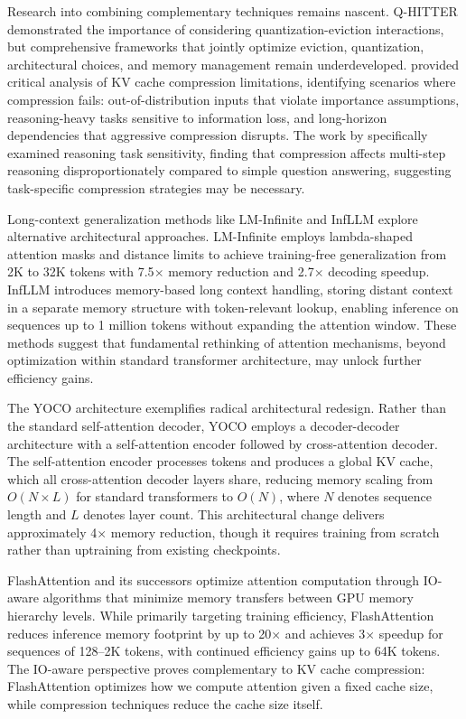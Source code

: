 Research into combining complementary techniques remains nascent. Q-HITTER demonstrated the importance of considering quantization-eviction interactions, but comprehensive frameworks that jointly optimize eviction, quantization, architectural choices, and memory management remain underdeveloped. \citet{paul2024pitfalls} provided critical analysis of KV cache compression limitations, identifying scenarios where compression fails: out-of-distribution inputs that violate importance assumptions, reasoning-heavy tasks sensitive to information loss, and long-horizon dependencies that aggressive compression disrupts. The work by \citet{wang2024holdonto} specifically examined reasoning task sensitivity, finding that compression affects multi-step reasoning disproportionately compared to simple question answering, suggesting task-specific compression strategies may be necessary.

Long-context generalization methods like LM-Infinite \citep{han2024lminfinite} and InfLLM \citep{zhang2024infllm} explore alternative architectural approaches. LM-Infinite employs lambda-shaped attention masks and distance limits to achieve training-free generalization from 2K to 32K tokens with 7.5$\times$ memory reduction and 2.7$\times$ decoding speedup. InfLLM introduces memory-based long context handling, storing distant context in a separate memory structure with token-relevant lookup, enabling inference on sequences up to 1 million tokens without expanding the attention window. These methods suggest that fundamental rethinking of attention mechanisms, beyond optimization within standard transformer architecture, may unlock further efficiency gains.

The YOCO architecture \citep{sun2024yoco} exemplifies radical architectural redesign. Rather than the standard self-attention decoder, YOCO employs a decoder-decoder architecture with a self-attention encoder followed by cross-attention decoder. The self-attention encoder processes tokens and produces a global KV cache, which all cross-attention decoder layers share, reducing memory scaling from $O(N \times L)$ for standard transformers to $O(N)$, where $N$ denotes sequence length and $L$ denotes layer count. This architectural change delivers approximately 4$\times$ memory reduction, though it requires training from scratch rather than uptraining from existing checkpoints.

FlashAttention \citep{dao2022flashattention} and its successors optimize attention computation through IO-aware algorithms that minimize memory transfers between GPU memory hierarchy levels. While primarily targeting training efficiency, FlashAttention reduces inference memory footprint by up to 20$\times$ and achieves 3$\times$ speedup for sequences of 128--2K tokens, with continued efficiency gains up to 64K tokens. The IO-aware perspective proves complementary to KV cache compression: FlashAttention optimizes how we compute attention given a fixed cache size, while compression techniques reduce the cache size itself.

